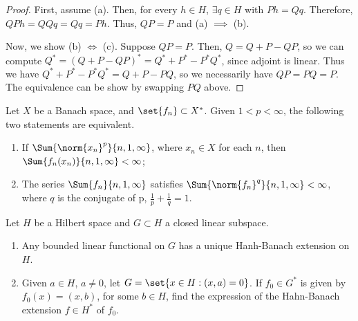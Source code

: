 \documentclass[12pt,letterpaper,twoside]{hmcpset}
\begin{document}
\begin{solution}
  \begin{proof}
    First, assume (a).
    Then, for every $h \in H$, $\exists q \in H$ with $Ph = Qq$.
    Therefore, $QPh = QQq = Qq = Ph$.
    Thus, $QP = P$ and (a) $\implies$ (b).

    Now, we show (b) $\Leftrightarrow$ (c).
    Suppose $QP = P$.
    Then, $Q = Q + P - QP$, so we can compute $Q^* = (Q + P - QP)^* = Q^* + P^* - P^*Q^*$, since adjoint is linear.
    Thus we have $Q^* + P^* - P^*Q^* = Q + P - PQ$, so we necessarily have $QP = PQ = P$.
    The equivalence can be show by swapping $PQ$ above.
  \end{proof}
\end{solution}
\begin{problem}[3][15]
  Let $X$ be a Banach space, and $\set{f_n} \subset X^*$.  Given $1 < p < \infty$, the following two statements are equivalent.
  \begin{enumerate}[label=(\alph*)]
  \item If $\Sum{\norm{x_n}^p}{n,1,\infty}$, where $x_n \in X$ for each $n$, then $\Sum{f_n(x_n)}{n,1,\infty} < \infty$;
  \item The series $\Sum{f_n}{n,1,\infty}$ satisfies $\Sum{\norm{f_n}^q}{n,1,\infty} < \infty$, where $q$ is the conjugate of p, \ie{} $\frac{1}{p} + \frac{1}{q} = 1$. 
  \end{enumerate}

\end{problem}

\begin{problem}[4][15]
  Let $H$ be a Hilbert space and $G \subset H$ a closed linear subspace.
  \begin{enumerate}[label=(\alph*)]
  \item Any bounded linear functional on $G$ has a unique Hanh-Banach extension on $H$.
  \item Given $a \in H$, $a \not= 0$, let $G = \set{x \in H : (x,a) = 0}$.
    If $f_0 \in G^*$ is given by $f_0(x) = (x,b)$, for some $b \in H$, find the expression of the Hahn-Banach extension $f \in H^*$ of $f_0$.
  \end{enumerate}
\end{problem}
\end{document}

